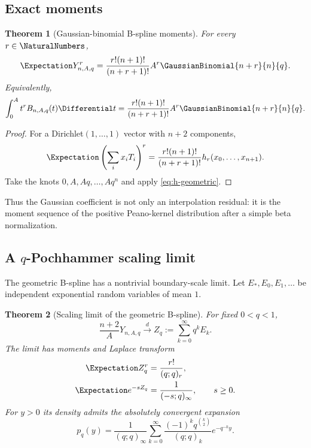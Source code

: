 \documentclass[11pt,oneside]{article}
\numberwithin{equation}{section}
\newtheorem{theorem}{Theorem}[section]
\theoremstyle{definition}
\theoremstyle{remark}
\begin{document}
\subsection{Exact moments}

\begin{theorem}[Gaussian-binomial B-spline moments]
For every $r\in\NaturalNumbers$,
\begin{equation}
 \Expectation Y_{n,A,q}^r
 =\frac{r!(n+1)!}{(n+r+1)!}
 A^r\GaussianBinomial{n+r}{n}{q}.
 \label{eq:Y-moments}
\end{equation}
Equivalently,
\begin{equation}
 \int_0^At^rB_{n,A,q}(t)\Differential t
 =\frac{r!(n+1)!}{(n+r+1)!}
 A^r\GaussianBinomial{n+r}{n}{q}.
\end{equation}
\end{theorem}

\begin{proof}
For a Dirichlet$(1,\ldots,1)$ vector with $n+2$ components,
\[
 \Expectation\left(\sum_i x_iT_i\right)^r
 =\frac{r!(n+1)!}{(n+r+1)!}h_r(x_0,\ldots,x_{n+1}).
\]
Take the knots $0,A,Aq,\ldots,Aq^n$ and apply
\eqref{eq:h-geometric}.
\end{proof}

Thus the Gaussian coefficient is not only an interpolation residual: it is the
moment sequence of the positive Peano-kernel distribution after a simple beta
normalization.

\subsection{A $q$-Pochhammer scaling limit}

The geometric B-spline has a nontrivial boundary-scale limit.  Let
$E_*,E_0,E_1,\ldots$ be independent exponential random variables of mean $1$.

\begin{theorem}[Scaling limit of the geometric B-spline]
For fixed $0<q<1$,
\begin{equation}
 \frac{n+2}{A}Y_{n,A,q}
 \xrightarrow{\ d\ }
 Z_q:=\sum_{k=0}^{\infty}q^kE_k.
 \label{eq:Y-scaling-limit}
\end{equation}
The limit has moments and Laplace transform
\begin{align}
 \Expectation Z_q^r&=\frac{r!}{(q;q)_r},
 \label{eq:Z-moments}\\
 \Expectation e^{-sZ_q}&=\frac1{(-s;q)_\infty},\qquad s\ge0.
 \label{eq:Z-Laplace}
\end{align}
For $y>0$ its density admits the absolutely convergent expansion
\begin{equation}
 p_q(y)=\frac1{(q;q)_\infty}
 \sum_{k=0}^{\infty}
 \frac{(-1)^kq^{\binom{k}{2}}}{(q;q)_k}
 e^{-q^{-k}y}.
 \label{eq:Z-density}
\end{equation}
\end{theorem}
\end{document}
